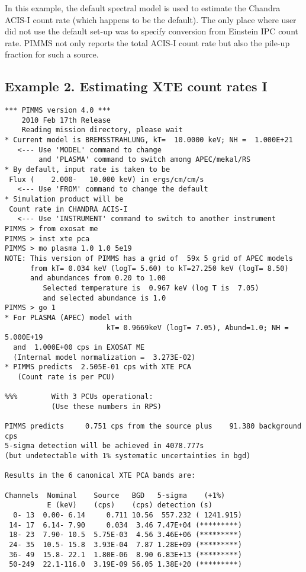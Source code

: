 \documentclass[11pt]{article}
\begin{document}
In this example, the default spectral model is used to estimate
the Chandra ACIS-I count rate (which happens to be the default). 
The only place where user did not use the default set-up was to specify
conversion from Einstein IPC count rate.  PIMMS not only reports
the total ACIS-I count rate but also the pile-up fraction for such
a source.

\subsection*{Example 2. Estimating XTE count rates I}

\begin{verbatim}
*** PIMMS version 4.0 ***
    2010 Feb 17th Release
    Reading mission directory, please wait
* Current model is BREMSSTRAHLUNG, kT=  10.0000 keV; NH =  1.000E+21
   <--- Use 'MODEL' command to change
        and 'PLASMA' command to switch among APEC/mekal/RS
* By default, input rate is taken to be
 Flux (    2.000-   10.000 keV) in ergs/cm/cm/s
   <--- Use 'FROM' command to change the default
* Simulation product will be
 Count rate in CHANDRA ACIS-I
   <--- Use 'INSTRUMENT' command to switch to another instrument
PIMMS > from exosat me
PIMMS > inst xte pca
PIMMS > mo plasma 1.0 1.0 5e19
NOTE: This version of PIMMS has a grid of  59x 5 grid of APEC models
      from kT= 0.034 keV (logT= 5.60) to kT=27.250 keV (logT= 8.50)
      and abundances from 0.20 to 1.00
         Selected temperature is  0.967 keV (log T is  7.05)
         and selected abundance is 1.0
PIMMS > go 1
* For PLASMA (APEC) model with
                        kT= 0.9669keV (logT= 7.05), Abund=1.0; NH =  5.000E+19
  and  1.000E+00 cps in EXOSAT ME
  (Internal model normalization =  3.273E-02)
* PIMMS predicts  2.505E-01 cps with XTE PCA
   (Count rate is per PCU)

%%%        With 3 PCUs operational:
           (Use these numbers in RPS)

PIMMS predicts     0.751 cps from the source plus    91.380 background cps
5-sigma detection will be achieved in 4078.777s
(but undetectable with 1% systematic uncertainties in bgd)

Results in the 6 canonical XTE PCA bands are:

Channels  Nominal    Source   BGD   5-sigma    (+1%)
          E (keV)    (cps)    (cps) detection (s)
  0- 13  0.00- 6.14     0.711 10.56  557.232 ( 1241.915)
 14- 17  6.14- 7.90     0.034  3.46 7.47E+04 (*********)
 18- 23  7.90- 10.5  5.75E-03  4.56 3.46E+06 (*********)
 24- 35  10.5- 15.8  3.93E-04  7.87 1.28E+09 (*********)
 36- 49  15.8- 22.1  1.80E-06  8.90 6.83E+13 (*********)
 50-249  22.1-116.0  3.19E-09 56.05 1.38E+20 (*********)


\end{verbatim}
\end{document}
